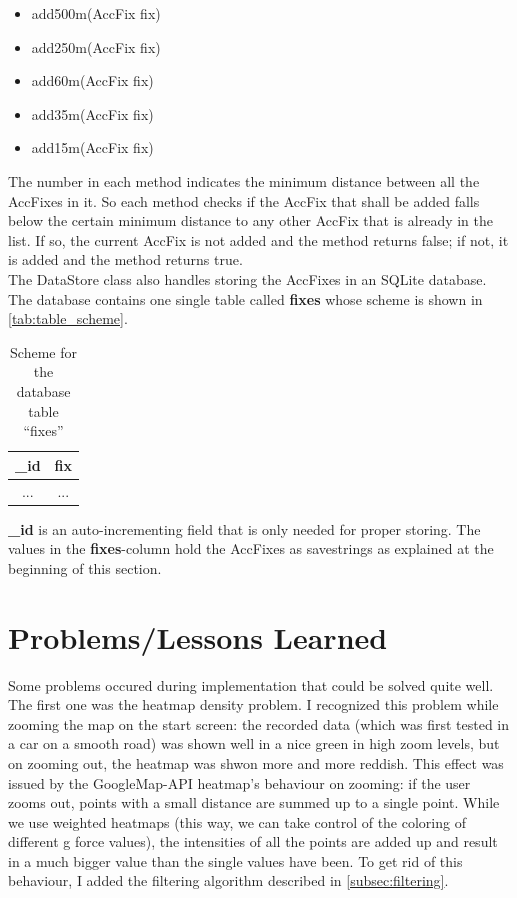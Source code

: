 \documentclass[10pt,a4paper]{article} %
\begin{document}
	\begin{itemize}
		\item add500m(AccFix fix)
		\item add250m(AccFix fix)
		\item add60m(AccFix fix)
		\item add35m(AccFix fix)
		\item add15m(AccFix fix)
	\end{itemize}

	\noindent
	The number in each method indicates the minimum distance between all the AccFixes in it. 
	So each method checks if the AccFix that shall be added falls below the certain minimum distance to any other AccFix that is already in the list.
	If so, the current AccFix is not added and the method returns false; if not, it is added and the method returns true.\\

	\noindent
	The DataStore class also handles storing the AccFixes in an SQLite database.
	The database contains one single table called \textbf{fixes} whose scheme is shown in \autoref{tab:table_scheme}.

	\begin{table}[H]
	  \centering
   
	  \begin{tabular}{c|c}
	   \_id & fix \\
	    \hline
	    	... & ...\\
	  \end{tabular}
	   \caption{Scheme for the database table ``fixes''} 
	   \label{tab:table_scheme}
	\end{table}

	\noindent
	\textbf{\_id} is an auto-incrementing field that is only needed for proper storing.
	The values in the \textbf{fixes}-column hold the AccFixes as savestrings as explained at the beginning of this section.
	
	\section{Problems/Lessons Learned}\label{sec:problems}

	Some problems occured during implementation that could be solved quite well.\\
	The first one was the heatmap density problem.
	I recognized this problem while zooming the map on the start screen: the recorded data (which was first tested in a car on a smooth road) was shown well in a nice green in high zoom levels, but on zooming out, the heatmap was shwon more and more reddish.
	This effect was issued by the GoogleMap-API heatmap's behaviour on zooming: if the user zooms out, points with a small distance are summed up to a single point.
	While we use weighted heatmaps (this way, we can take control of the coloring of different g force values), the intensities of all the points are added up and result in a much bigger value than the single values have been.
	To get rid of this behaviour, I added the filtering algorithm described in \autoref{subsec:filtering}.\\
\end{document}
